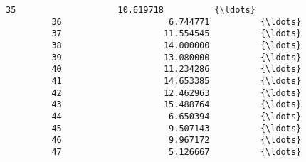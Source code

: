 \documentclass[11pt]{article}
\begin{document}
\begin{Verbatim}[commandchars=\\\{\}]
         35                    10.619718          {\ldots}             
         36                     6.744771          {\ldots}             
         37                    11.554545          {\ldots}             
         38                    14.000000          {\ldots}             
         39                    13.080000          {\ldots}             
         40                    11.234286          {\ldots}             
         41                    14.653385          {\ldots}             
         42                    12.462963          {\ldots}             
         43                    15.488764          {\ldots}             
         44                     6.650394          {\ldots}             
         45                     9.507143          {\ldots}             
         46                     9.967172          {\ldots}             
         47                     5.126667          {\ldots}             
         

\end{Verbatim}
\end{document}
